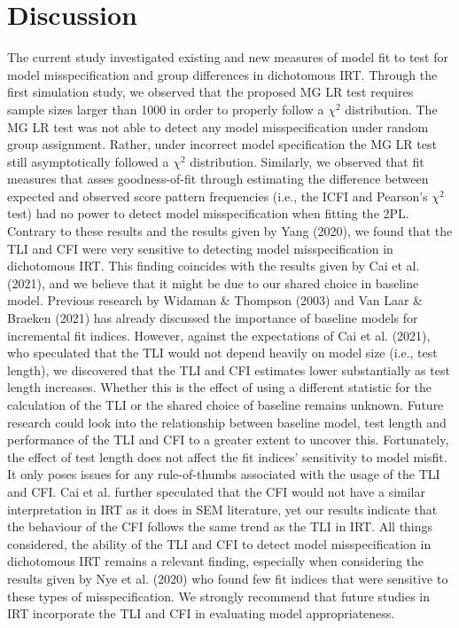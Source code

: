 \documentclass[Royal,sageapa,times,doublespace]{sagej}
\begin{document}
\section{Discussion}

The current study investigated existing and new measures of model fit to test for model misspecification and group differences in dichotomous IRT. Through the first simulation study, we observed that the proposed MG LR test requires sample sizes larger than 1000 in order to properly follow a $\chi^2$ distribution. The MG LR test was not able to detect any model misspecification under random group assignment. Rather, under incorrect model specification the MG LR test still asymptotically followed a $\chi^2$ distribution. Similarly, we observed that fit measures that asses goodness-of-fit through estimating the difference between expected and observed score pattern frequencies (i.e., the ICFI and Pearson's $\chi^2$ test) had no power to detect model misspecification when fitting the 2PL. \\
\indent Contrary to these results and the results given by Yang (2020), we found that the TLI and CFI were very sensitive to detecting model misspecification in dichotomous IRT. This finding coincides with the results given by Cai et al. (2021), and we believe that it might be due to our shared choice in baseline model. Previous research by Widaman \& Thompson (2003) and Van Laar \& Braeken (2021) has already discussed the importance of baseline models for incremental fit indices. However, against the expectations of Cai et al. (2021), who speculated that the TLI would not depend heavily on model size (i.e., test length), we discovered that the TLI and CFI estimates lower substantially as test length increases. Whether this is the effect of using a different statistic for the calculation of the TLI or the shared choice of baseline remains unknown. Future research could look into the relationship between baseline model, test length and performance of the TLI and CFI to a greater extent to uncover this. Fortunately, the effect of test length does not affect the fit indices' sensitivity to model misfit. It only poses issues for any rule-of-thumbs associated with the usage of the TLI and CFI. Cai et al. further speculated that the CFI would not have a similar interpretation in IRT as it does in SEM literature, yet our results indicate that the behaviour of the CFI follows the same trend as the TLI in IRT. All things considered, the ability of the TLI and CFI to detect model misspecification in dichotomous IRT remains a relevant finding, especially when considering the results given by Nye et al. (2020) who found few fit indices that were sensitive to these types of misspecification. We strongly recommend that future studies in IRT incorporate the TLI and CFI in evaluating model appropriateness. \\
\end{document}
